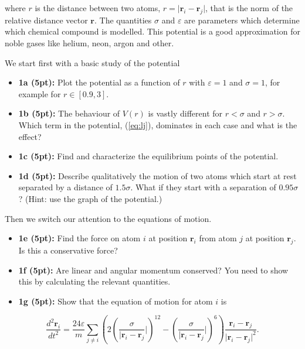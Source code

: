 \documentclass[%
oneside,                 %
final,                   %
10pt]{article}
\begin{document}
where $r$ is the distance between two atoms,
$r=\vert\bm{r}_i-\bm{r}_j\vert$, that is the norm of the relative
distance vector $\bm{r}$. The quantities $\sigma$ and $\varepsilon$ are
parameters which determine which chemical compound is modelled. This
potential is a good approximation for noble gases like helium, neon, argon and other.

We start first with a basic study of the potential

\begin{itemize}
\item \textbf{1a (5pt):} Plot the potential as a function of $r$ with $\varepsilon=1$ and $\sigma=1$, for example for $r \in [0.9,3]$.

\item \textbf{1b (5pt):} The behaviour of $V(r)$ is vastly different for $r < \sigma$ and $r > \sigma$. Which term in the potential, (\ref{eq:lj}), dominates in each case and what is the effect?

\item \textbf{1c (5pt):} Find and characterize the equilibrium points of the potential.

\item \textbf{1d (5pt):} Describe qualitatively the motion of two atoms which start at rest separated by a distance of ${1.5}\sigma$. What if they start with a separation of ${0.95}\sigma$?  (Hint: use the graph of the potential.)
\end{itemize}

\noindent
Then we switch our attention to the equations of motion.

\begin{itemize}
\item \textbf{1e (5pt):} Find the force on atom $i$ at position $\bm{r}_i$ from atom $j$ at position $\bm{r}_j$. Is this a conservative force?

\item \textbf{1f (5pt):}  Are linear and angular momentum conserved? You need to show this by calculating the relevant quantities.

\item \textbf{1g (5pt):} Show that the equation of motion for atom $i$ is
\end{itemize}

\noindent
\[
  \frac{d^2\bm{r}_i}{dt^2} = \frac{24\varepsilon}{m} \sum_{j \neq i} \left(2(\frac{\sigma}{\vert\bm{r}_i-\bm{r}_j}\vert)^{12}-(\frac{\sigma}{\vert\bm{r}_i-\bm{r}_j}\vert)^6\right)\frac{\bm{r}_i-\bm{r}_j}{\vert\bm{r}_i-\bm{r}_j\vert^2}.
\]
\end{document}
